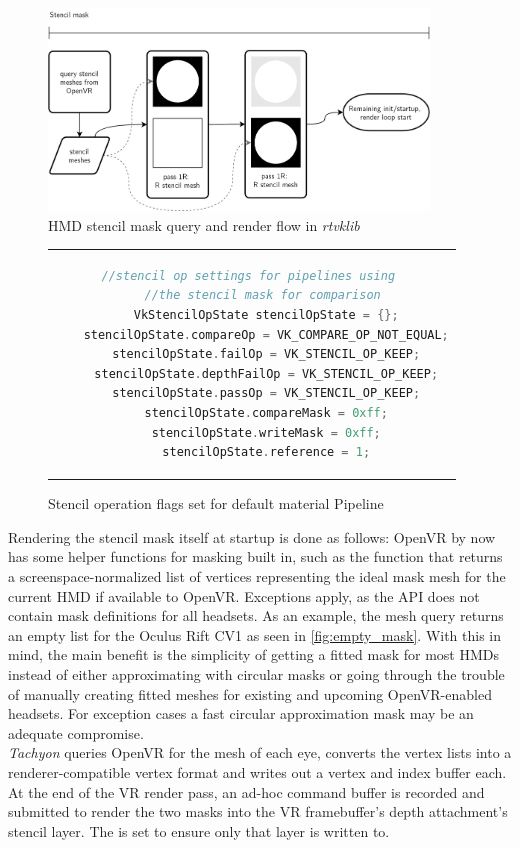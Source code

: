 \begin{figure}[htb]
  \centering
  \includegraphics[width=0.9\textwidth]{pictures/StencilMask}
  \caption{HMD stencil mask query and render flow in \textit{rtvklib}} \label{fig:StencilMask}
\end{figure}

\begin{figure}[htb]
  \centering
  \begin{tabular}{c}
  \begin{lstlisting}[language=C++]
	//stencil op settings for pipelines using 
	//the stencil mask for comparison 
	VkStencilOpState stencilOpState = {};
	stencilOpState.compareOp = VK_COMPARE_OP_NOT_EQUAL;
	stencilOpState.failOp = VK_STENCIL_OP_KEEP;
	stencilOpState.depthFailOp = VK_STENCIL_OP_KEEP;
	stencilOpState.passOp = VK_STENCIL_OP_KEEP;
	stencilOpState.compareMask = 0xff;
	stencilOpState.writeMask = 0xff;
	stencilOpState.reference = 1;
	\end{lstlisting}
  \end{tabular}
  \caption[Material pipeline stencil operation flags]{Stencil operation flags set for default material Pipeline}\label{fig:lst_StencilOpState_MaterialPipeline}
\end{figure}

Rendering the stencil mask itself at startup is done as follows: 
OpenVR by now has some helper functions for masking built in, such as the  function that returns a screenspace-normalized list of vertices representing the ideal mask mesh for the current HMD if available to OpenVR. Exceptions apply, as the API does not contain mask definitions for all headsets. As an example, the mesh query returns an empty list for the Oculus Rift CV1 as seen in \autoref{fig:empty_mask}. With this in mind, the main benefit is the simplicity of getting a fitted mask for most HMDs instead of either approximating with circular masks or going through the trouble of manually creating fitted meshes for existing and upcoming OpenVR-enabled headsets. For exception cases a fast circular approximation mask may be an adequate compromise. \\
\textit{\gls{Tachyon}} queries OpenVR for the mesh of each eye, converts the vertex lists into a renderer-compatible vertex format and writes out a vertex and index buffer each. 
At the end of the \gls{VR} render pass, an ad-hoc command buffer is recorded and submitted to render the two masks into the \gls{VR} framebuffer's depth attachment's stencil layer. The  is set to ensure only that layer is written to. \\

